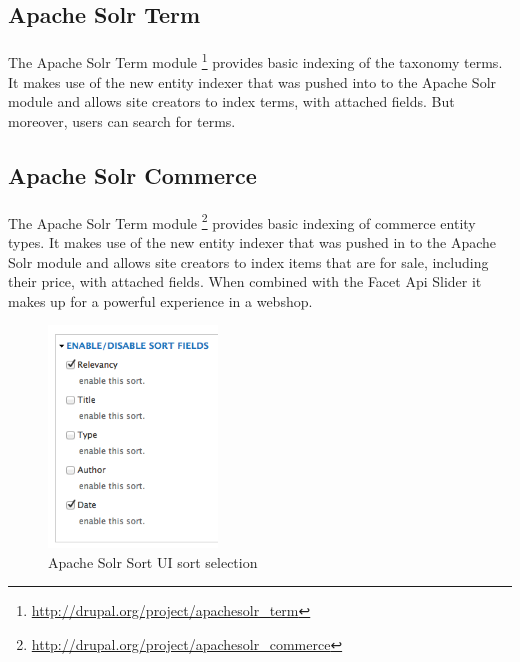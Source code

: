 \subsection{Apache Solr Term}
\paragraph{}The Apache Solr Term module \footnote{\url{http://drupal.org/project/apachesolr_term}} provides basic indexing of the taxonomy terms. It makes use of the new entity indexer that was pushed into to the Apache Solr module and allows site creators to index terms, with attached fields. But moreover, users can search for terms.

\subsection{Apache Solr Commerce}
\paragraph{}The Apache Solr Term module \footnote{\url{http://drupal.org/project/apachesolr_commerce}} provides basic indexing of commerce entity types. It makes use of the new entity indexer that was pushed in to the Apache Solr module and allows site creators to index items that are for sale, including their price, with attached fields. When combined with the Facet Api Slider it makes up for a powerful experience in a webshop.

\begin{figure}
\begin{center}
  \vspace{-25pt}
   \includegraphics[width=0.4\textwidth]{images/implementation/apachesolr_sort.png}
   \caption{Apache Solr Sort UI sort selection}
\end{center}
\end{figure}

